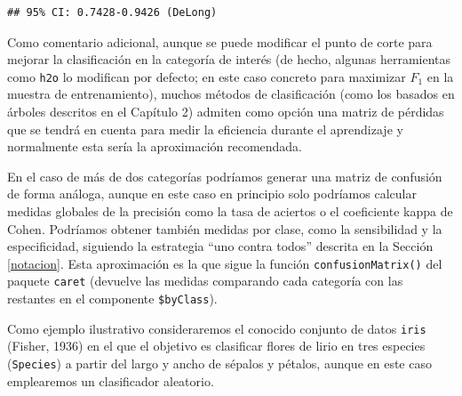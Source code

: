 \documentclass[]{book}
\newenvironment{Shaded}{\begin{snugshade}}{\end{snugshade}}
\newcommand{\KeywordTok}[1]{\textcolor[rgb]{0.13,0.29,0.53}{\textbf{#1}}}
\newcommand{\DecValTok}[1]{\textcolor[rgb]{0.00,0.00,0.81}{#1}}
\newcommand{\FloatTok}[1]{\textcolor[rgb]{0.00,0.00,0.81}{#1}}
\newcommand{\StringTok}[1]{\textcolor[rgb]{0.31,0.60,0.02}{#1}}
\newcommand{\CommentTok}[1]{\textcolor[rgb]{0.56,0.35,0.01}{\textit{#1}}}
\newcommand{\OperatorTok}[1]{\textcolor[rgb]{0.81,0.36,0.00}{\textbf{#1}}}
\newcommand{\NormalTok}[1]{#1}
\theoremstyle{break}
\theoremstyle{definition}
\theoremstyle{definition}
\theoremstyle{definition}
\theoremstyle{remark}
\begin{document}
\begin{verbatim}
## 95% CI: 0.7428-0.9426 (DeLong)
\end{verbatim}

Como comentario adicional, aunque se puede modificar el punto de corte
para mejorar la clasificación en la categoría de interés (de hecho,
algunas herramientas como \texttt{h2o} lo modifican por defecto; en este
caso concreto para maximizar \(F_1\) en la muestra de entrenamiento),
muchos métodos de clasificación (como los basados en árboles descritos
en el Capítulo 2) admiten como opción una matriz de pérdidas que se
tendrá en cuenta para medir la eficiencia durante el aprendizaje y
normalmente esta sería la aproximación recomendada.

En el caso de más de dos categorías podríamos generar una matriz de
confusión de forma análoga, aunque en este caso en principio solo
podríamos calcular medidas globales de la precisión como la tasa de
aciertos o el coeficiente kappa de Cohen. Podríamos obtener también
medidas por clase, como la sensibilidad y la especificidad, siguiendo la
estrategia ``uno contra todos'' descrita en la Sección \ref{notacion}.
Esta aproximación es la que sigue la función \texttt{confusionMatrix()}
del paquete \texttt{caret} (devuelve las medidas comparando cada
categoría con las restantes en el componente \texttt{\$byClass}).

Como ejemplo ilustrativo consideraremos el conocido conjunto de datos
\texttt{iris} (Fisher, 1936) en el que el objetivo es clasificar flores
de lirio en tres especies (\texttt{Species}) a partir del largo y ancho
de sépalos y pétalos, aunque en este caso emplearemos un clasificador
aleatorio.

\begin{Shaded}
\end{Shaded}
\end{document}
